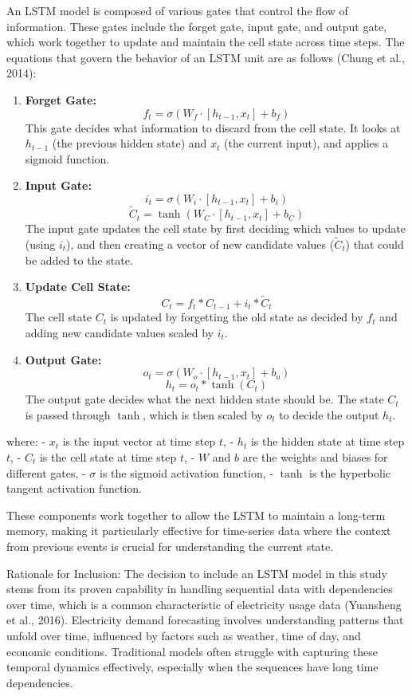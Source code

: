 \documentclass[
]{article}
\begin{document}
An LSTM model is composed of various gates that control the flow of
information. These gates include the forget gate, input gate, and output
gate, which work together to update and maintain the cell state across
time steps. The equations that govern the behavior of an LSTM unit are
as follows (Chung et al., 2014):

\begin{enumerate}
\def\labelenumi{\arabic{enumi}.}
\item
  \textbf{Forget Gate:}
  \[ f_t = \sigma(W_f \cdot [h_{t-1}, x_t] + b_f) \] This gate decides
  what information to discard from the cell state. It looks at
  \(h_{t-1}\) (the previous hidden state) and \(x_t\) (the current
  input), and applies a sigmoid function.
\item
  \textbf{Input Gate:}
  \[ i_t = \sigma(W_i \cdot [h_{t-1}, x_t] + b_i) \]
  \[ \tilde{C}_t = \tanh(W_C \cdot [h_{t-1}, x_t] + b_C) \] The input
  gate updates the cell state by first deciding which values to update
  (using \(i_t\)), and then creating a vector of new candidate values
  (\(\tilde{C}_t\)) that could be added to the state.
\item
  \textbf{Update Cell State:}
  \[ C_t = f_t * C_{t-1} + i_t * \tilde{C}_t \] The cell state \(C_t\)
  is updated by forgetting the old state as decided by \(f_t\) and
  adding new candidate values scaled by \(i_t\).
\item
  \textbf{Output Gate:}
  \[ o_t = \sigma(W_o \cdot [h_{t-1}, x_t] + b_o) \]
  \[ h_t = o_t * \tanh(C_t) \] The output gate decides what the next
  hidden state should be. The state \(C_t\) is passed through \(\tanh\),
  which is then scaled by \(o_t\) to decide the output \(h_t\).
\end{enumerate}

where: - \(x_t\) is the input vector at time step \(t\), - \(h_t\) is
the hidden state at time step \(t\), - \(C_t\) is the cell state at time
step \(t\), - \(W\) and \(b\) are the weights and biases for different
gates, - \(\sigma\) is the sigmoid activation function, - \(\tanh\) is
the hyperbolic tangent activation function.

These components work together to allow the LSTM to maintain a long-term
memory, making it particularly effective for time-series data where the
context from previous events is crucial for understanding the current
state.

Rationale for Inclusion: The decision to include an LSTM model in this
study stems from its proven capability in handling sequential data with
dependencies over time, which is a common characteristic of electricity
usage data (Yuansheng et al., 2016). Electricity demand forecasting
involves understanding patterns that unfold over time, influenced by
factors such as weather, time of day, and economic conditions.
Traditional models often struggle with capturing these temporal dynamics
effectively, especially when the sequences have long time dependencies.
\end{document}
